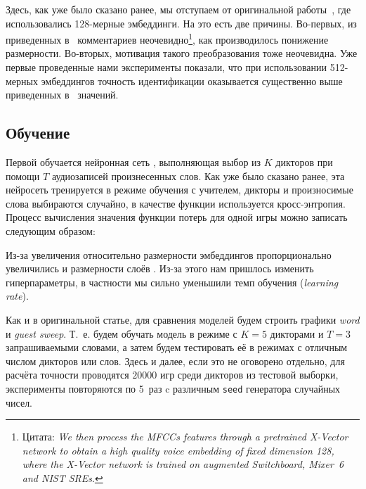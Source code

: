 Здесь, как уже было сказано ранее, мы отступаем от оригинальной
работы~\cite{isrpaper}, где использовались 128-мерные эмбеддинги. На это есть
две причины. Во-первых, из приведенных в~\cite{isrpaper} комментариев
неочевидно\footnote{
    Цитата: \textit{We then process the MFCCs features through a pretrained
    X-Vector network to obtain a high quality voice embedding of fixed dimension
    128, where the X-Vector network is trained on augmented Switchboard, Mixer~6
    and NIST SREs}.
}, как производилось понижение размерности.
Во-вторых, мотивация такого преобразования тоже неочевидна. Уже первые проведенные
нами эксперименты показали, что при использовании 512-мерных эмбеддингов точность
идентификации оказывается существенно выше приведенных в~\cite{isrpaper} значений.

\subsection{Обучение \guesser{}}

Первой обучается нейронная сеть \guesser{}, выполняющая выбор из $K$ дикторов
при помощи $T$ аудиозаписей произнесенных слов. Как уже было сказано ранее,
эта нейросеть тренируется в режиме обучения с учителем, дикторы и произносимые
слова выбираются случайно, в качестве функции используется кросс-энтропия.
Процесс вычисления значения функции потерь для одной игры можно записать
следующим образом:


Из-за увеличения относительно \citeisr{} размерности эмбеддингов пропорционально
увеличились и размерности слоёв \guesser{}. Из-за этого нам пришлось изменить
гиперпараметры, в частности мы сильно уменьшили темп обучения
(\textit{learning rate}).

Как и в оригинальной статье, для сравнения моделей будем строить графики
\textit{word} и \textit{guest sweep}. Т.~е. будем обучать модель в режиме с $K =
5$ дикторами и $T = 3$ запрашиваемыми словами, а затем будем тестировать её в
режимах с отличным числом дикторов или слов. Здесь и далее, если это не оговорено
отдельно, для расчёта точности проводятся $20000$ игр среди дикторов из тестовой
выборки, эксперименты повторяются по 5~раз c различным \texttt{seed} генератора
случайных чисел.

